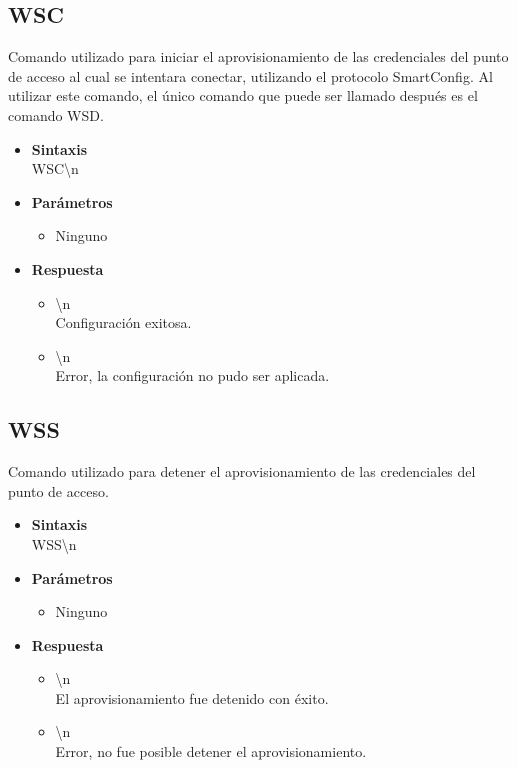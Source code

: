 \documentclass[a4paper,spanish]{article}
\begin{document}
\subsection{WSC}
Comando utilizado para iniciar el aprovisionamiento de las credenciales del punto de acceso al cual se intentara conectar, utilizando el protocolo SmartConfig. Al utilizar este comando, el único comando que puede ser llamado después es el comando WSD. 
\begin{itemize}
	\item \textbf{Sintaxis}\\
	{\ttfamily WSC\textbackslash n}
	\item \textbf{Parámetros}
	\begin{itemize}
		\item Ninguno 
	\end{itemize}
	\item \textbf{Respuesta}
	\begin{itemize}
		\item{\textbackslash n} \\
		Configuración exitosa.
		\item{\textbackslash n} \\
		Error, la configuración no pudo ser aplicada.
	\end{itemize}
\end{itemize}

\subsection{WSS}
Comando utilizado para detener el aprovisionamiento de las credenciales del punto de acceso.  
\begin{itemize}
	\item \textbf{Sintaxis}\\
	{\ttfamily WSS\textbackslash n}
	\item \textbf{Parámetros}
	\begin{itemize}
		\item Ninguno 
	\end{itemize}
	\item \textbf{Respuesta}
	\begin{itemize}
		\item{\textbackslash n} \\
		El aprovisionamiento fue detenido con éxito.
		\item{\textbackslash n} \\
		Error, no fue posible detener el aprovisionamiento.
	\end{itemize}
\end{itemize}
\end{document}
